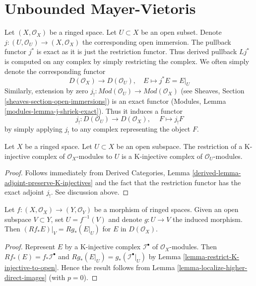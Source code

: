 \section{Unbounded Mayer-Vietoris}
\label{section-unbounded-mayer-vietoris}

\noindent
Let $(X, \mathcal{O}_X)$ be a ringed space. Let $U \subset X$ be an
open subset. Denote $j : (U, \mathcal{O}_U) \to (X, \mathcal{O}_X)$
the corresponding open immersion. The pullback functor $j^*$ is exact
as it is just the restriction functor. Thus derived pullback $Lj^*$ is
computed on any complex by simply restricting the complex. We often
simply denote the corresponding functor
$$
D(\mathcal{O}_X) \to D(\mathcal{O}_U),
\quad
E \mapsto j^*E = E|_U
$$
Similarly, extension by zero
$j_! : \textit{Mod}(\mathcal{O}_U) \to \textit{Mod}(\mathcal{O}_X)$
(see Sheaves, Section \ref{sheaves-section-open-immersions})
is an exact functor (Modules, Lemma \ref{modules-lemma-j-shriek-exact}).
Thus it induces a functor
$$
j_! : D(\mathcal{O}_U) \to D(\mathcal{O}_X),\
\quad
F \mapsto j_!F
$$
by simply applying $j_!$ to any complex representing the object $F$.

\begin{lemma}
\label{lemma-restrict-K-injective-to-open}
Let $X$ be a ringed space. Let $U \subset X$ be an open subspace.
The restriction of a K-injective complex of $\mathcal{O}_X$-modules
to $U$ is a K-injective complex of $\mathcal{O}_U$-modules.
\end{lemma}

\begin{proof}
Follows immediately from
Derived Categories, Lemma \ref{derived-lemma-adjoint-preserve-K-injectives}
and the fact that the restriction functor has the
exact adjoint $j_!$. See discussion above.
\end{proof}

\begin{lemma}
\label{lemma-restrict-direct-image-open}
Let $f : (X, \mathcal{O}_X) \to (Y, \mathcal{O}_Y)$ be a morphism of ringed
spaces. Given an open subspace $V \subset Y$, set $U = f^{-1}(V)$ and denote
$g : U \to V$ the induced morphism. Then
$(Rf_*E)|_V = Rg_*(E|_U)$ for $E$ in $D(\mathcal{O}_X)$.
\end{lemma}

\begin{proof}
Represent $E$ by a K-injective complex $\mathcal{I}^\bullet$ of
$\mathcal{O}_X$-modules. Then $Rf_*(E) = f_*\mathcal{I}^\bullet$
and $Rg_*(E|_U) = g_*(\mathcal{I}^\bullet|_U)$ by
Lemma \ref{lemma-restrict-K-injective-to-open}.
Hence the result follows from Lemma \ref{lemma-localize-higher-direct-images}
(with $p = 0$).
\end{proof}


